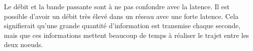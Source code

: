 
Le débit et la bande passante sont à ne pas confondre avec la latence. Il est possible d'avoir un débit très élevé dans un réseau avec une forte latence. Cela signifierait qu'une grande quantité d'information est transmise chaque seconde, mais que ces informations mettent beaucoup de temps à réaliser le trajet entre les deux noeuds.

